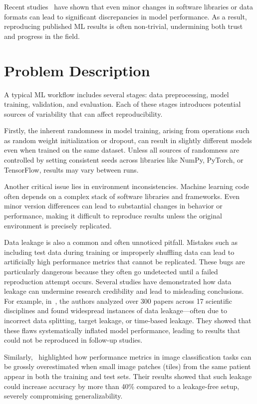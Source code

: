 \documentclass[11pt]{article}
\begin{document}
Recent studies~\cite{DBLP:journals/ncs/X21i,DBLP:conf/qrs/Rivera-LandosKN21} have shown that even 
 minor changes in software libraries or data formats can lead to significant discrepancies in 
 model performance. 
%
As a result, reproducing published ML results is often non-trivial, 
 undermining both trust and progress in the field.

\section{Problem Description}
\label{sec:problem}
A typical ML workflow includes several stages: 
 data preprocessing, model training, validation, and evaluation. 
% 
Each of these stages introduces potential sources of variability 
 that can affect reproducibility.

Firstly, the inherent randomness in model training, 
 arising from operations such as random weight initialization or dropout,
 can result in slightly different models even when trained on the same dataset. 
%
Unless all sources of randomness are controlled by setting consistent seeds 
 across libraries like NumPy, PyTorch, or TensorFlow, 
 results may vary between runs.

Another critical issue lies in environment inconsistencies. 
%
Machine learning code often depends on a complex stack of software libraries and frameworks. 
%
Even minor version differences can lead to substantial changes in behavior or performance, 
 making it difficult to reproduce results unless the original environment is precisely replicated.

Data leakage is also a common and often unnoticed pitfall. 
%
Mistakes such as including test data during training or improperly shuffling data can lead to 
 artificially high performance metrics that cannot be replicated. 
% 
These bugs are particularly dangerous because they often go 
 undetected until a failed reproduction attempt occurs.
%
Several studies have demonstrated how data leakage can undermine research credibility 
 and lead to misleading conclusions.
%
For example, in~\cite{DBLP:journals/patterns/KapoorN23}, the authors analyzed 
 over 300 papers across 17 scientific disciplines and found widespread instances 
 of data leakage---often due to incorrect data splitting, target leakage, or time-based leakage. 
% 
They showed that these flaws systematically inflated model performance, leading to results 
 that could not be reproduced in follow-up studies.

Similarly,~\cite{DBLP:conf/icpr/BussolaMMJF20} highlighted how performance metrics in image 
 classification tasks can be grossly overestimated when small image patches (tiles) from the 
 same patient appear in both the training and test sets. 
%
Their results showed that such leakage could increase accuracy by more than 40\% compared to a 
 leakage-free setup, severely compromising generalizability.
\end{document}
